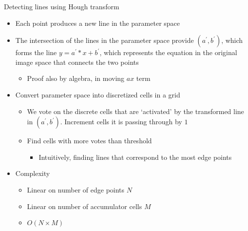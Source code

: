 Detecting lines using Hough transform
\begin{itemize}
    \item Each point produces a new line in the parameter space
    \item The intersection of the lines in the parameter space provide $(a^\prime,b^\prime)$, which forms the line $y=a^\prime*x + b^\prime$, which represents the equation in the original image space that connects the two points
    \begin{itemize}
        \item Proof also by algebra, in moving $ax$ term
    \end{itemize}
    \item Convert parameter space into discretized cells in a grid
    \begin{itemize}
        \item We vote on the discrete cells that are `activated' by the transformed line in $(a^\prime, b^\prime)$. Increment cells it is passing through by $1$
        \item Find cells with more votes than threshold
        \begin{itemize}
            \item Intuitively, finding lines that correspond to the most edge points
        \end{itemize}
    \end{itemize}
    \item Complexity
    \begin{itemize}
        \item Linear on number of edge points $N$
        \item Linear on number of accumulator cells $M$
        \item $O(N\times M)$
    \end{itemize}
\end{itemize}

